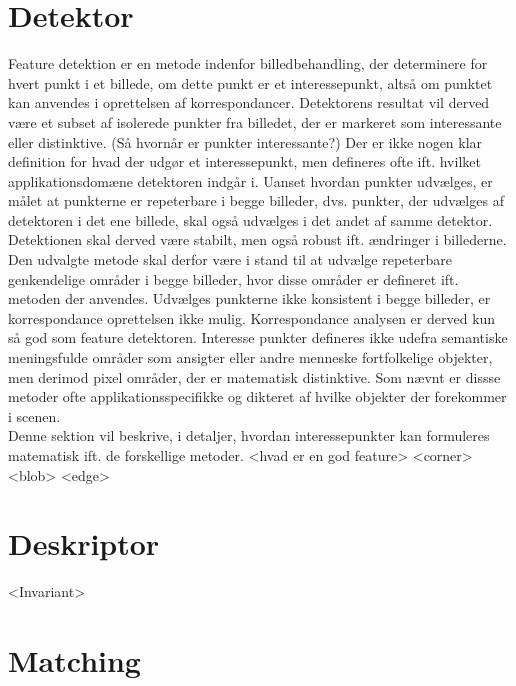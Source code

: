 \section{Detektor}
Feature detektion er en metode indenfor billedbehandling, der determinere for hvert punkt i et billede, om dette punkt er et interessepunkt, altså om punktet kan anvendes i oprettelsen af korrespondancer. Detektorens resultat vil derved være et subset af isolerede punkter fra billedet, der er markeret som interessante eller distinktive. (Så hvornår er punkter interessante?) Der er ikke nogen klar definition for hvad der udgør et interessepunkt, men defineres ofte ift. hvilket applikationsdomæne detektoren indgår i. Uanset hvordan punkter udvælges, er målet at punkterne er repeterbare i begge billeder, dvs. punkter, der udvælges af detektoren i det ene billede, skal også udvælges i det andet af samme detektor. Detektionen skal derved være stabilt, men også robust ift. ændringer i billederne. Den udvalgte metode skal derfor være i stand til at udvælge repeterbare genkendelige områder i begge billeder, hvor disse områder er defineret ift. metoden der anvendes.  Udvælges punkterne ikke konsistent i begge billeder, er korrespondance oprettelsen ikke mulig. Korrespondance analysen er derved kun så god som feature detektoren. 
Interesse punkter defineres ikke udefra semantiske meningsfulde områder som ansigter eller andre menneske fortfolkelige objekter, men derimod pixel områder, der er matematisk distinktive. Som nævnt er dissse metoder ofte applikationsspecifikke og dikteret af hvilke objekter der forekommer i scenen. \\

Denne sektion vil beskrive, i detaljer, hvordan interessepunkter kan formuleres matematisk ift. de forskellige metoder.
<hvad er en god feature>
<corner>
<blob>
<edge>
\section{Deskriptor}
<Invariant>
\section{Matching}
